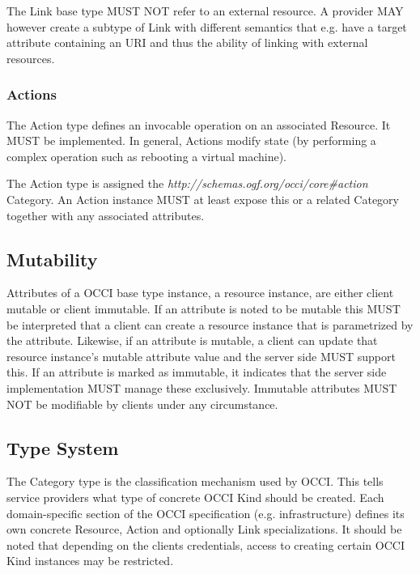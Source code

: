 \documentclass[10pt,a4paper]{article}
\begin{document}
The Link base type MUST NOT refer to an external resource. A provider MAY however create a subtype of Link with different semantics that e.g. have a target attribute containing an URI and thus the ability of linking with external resources.

\subsubsection{Actions}
The Action type defines an invocable operation on an associated Resource. It MUST be implemented. In general, Actions modify state (by performing a complex operation such as rebooting a virtual machine).

The Action type is assigned the \textit{http://schemas.ogf.org/occi/core\#action} Category. An Action instance MUST at least expose this or a related Category together with any associated attributes.

\subsection{Mutability}
Attributes of a OCCI base type instance, a resource instance, are either client mutable or client immutable. If an attribute is noted to be mutable this MUST be interpreted that a client can create a resource instance that is parametrized by the attribute. Likewise, if an attribute is mutable, a client can update that resource instance's mutable attribute value and the server side MUST support this. If an attribute is marked as immutable, it indicates that the server side implementation MUST manage these exclusively. Immutable attributes MUST NOT be modifiable by clients under any circumstance.

\subsection{Type System}
\label{sec:type_system}
The Category type is the classification mechanism used by OCCI. This tells service providers what type of concrete OCCI Kind should be created. Each domain-specific section of the OCCI specification (e.g. infrastructure) defines its own concrete Resource, Action and optionally Link specializations. It should be noted that depending on the clients credentials, access to creating certain OCCI Kind instances may be restricted.
\end{document}
